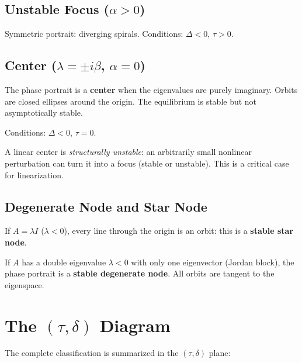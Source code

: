 \subsection{Unstable Focus ($\alpha > 0$)}

Symmetric portrait: diverging spirals. Conditions: $\Delta < 0$, $\tau > 0$.

\subsection{Center ($\lambda = \pm i\beta$, $\alpha = 0$)}

\begin{definition}[Center]
The phase portrait is a \textbf{center} when the eigenvalues are purely
imaginary. Orbits are closed ellipses around the origin. The equilibrium is
stable but not asymptotically stable.
\end{definition}

Conditions: $\Delta < 0$, $\tau = 0$.

\begin{warning}[title=\textbf{Centers and nonlinear perturbations}]
A linear center is \emph{structurally unstable}: an arbitrarily small
nonlinear perturbation can turn it into a focus (stable or unstable). This is
a critical case for linearization.
\end{warning}

\subsection{Degenerate Node and Star Node}

\begin{definition}
If $A = \lambda I$ ($\lambda < 0$), every line through the origin is an orbit:
this is a \textbf{stable star node}.
\end{definition}

\begin{definition}
If $A$ has a double eigenvalue $\lambda < 0$ with only one eigenvector
(Jordan block), the phase portrait is a \textbf{stable degenerate node}.
All orbits are tangent to the eigenspace.
\end{definition}

\section{The $(\tau, \delta)$ Diagram}

The complete classification is summarized in the $(\tau, \delta)$ plane:

